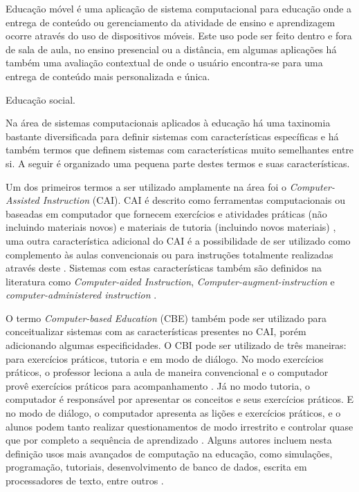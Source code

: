 Educação móvel é uma aplicação de sistema computacional para educação onde a entrega de conteúdo ou gerenciamento da atividade de ensino e aprendizagem ocorre através do uso de dispositivos móveis. Este uso pode ser feito dentro e fora de sala de aula, no ensino presencial ou a distância, em algumas aplicações há também uma avaliação contextual de onde o usuário encontra-se para uma entrega de conteúdo mais personalizada e única.

Educação social.

 Na área de sistemas computacionais aplicados à educação há uma taxinomia bastante diversificada para definir sistemas com características específicas e há também termos que definem sistemas com características muito semelhantes entre si. A seguir é organizado uma pequena parte destes termos e suas características.

Um dos primeiros termos a ser utilizado amplamente na área foi o \emph{Computer-Assisted Instruction} (CAI). CAI é descrito como ferramentas computacionais ou baseadas em computador que fornecem exercícios e atividades práticas (não incluindo materiais novos) e materiais de tutoria (incluindo novos materiais) \cite{wheres98}, uma outra característica adicional do CAI é a possibilidade de ser utilizado como complemento às aulas convencionais ou para instruções totalmente realizadas através deste \cite{cotton91}. Sistemas com estas características também são definidos na literatura como \emph{Computer-aided Instruction}, \emph{Computer-augment-instruction} e \emph{computer-administered instruction} \cite{effectiveness85}.

O termo \emph{Computer-based Education} (CBE) também pode ser utilizado para conceitualizar sistemas com as características presentes no CAI, porém adicionando algumas especificidades. O CBI pode ser utilizado de três maneiras: para exercícios práticos, tutoria e em modo de diálogo. No modo exercícios práticos, o  professor leciona a aula de maneira convencional e o computador provê exercícios práticos para acompanhamento \cite{wheres98}. Já no modo tutoria, o computador é responsável por apresentar os conceitos e seus exercícios práticos. E no modo de diálogo, o computador apresenta as lições e exercícios práticos, e o alunos podem tanto realizar questionamentos de modo irrestrito e controlar quase que por completo a sequência de aprendizado \cite{wheres98}. Alguns autores incluem nesta definição usos mais avançados de computação na educação, como simulações, programação, tutoriais, desenvolvimento de banco de dados, escrita em processadores de texto, entre outros \cite{cotton91}.

